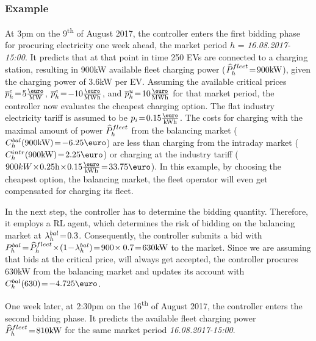 \documentclass[a4paper, 12pt]{article}
\begin{document}
\subsubsection{Example}
\label{sec:orgf77673c}
At 3pm on the 9\textsuperscript{th} of August 2017, the controller enters the first bidding
phase for procuring electricity one week ahead, the market period \(h\) =
\emph{16.08.2017-15:00}. It predicts that at that point in time 250 EVs are connected
to a charging station, resulting in 900kW available fleet charging power
(\(\widehat{P}^{fleet}_{h}\!=\!900\text{kW}\)), given the charging power of 3.6kW per EV. Assuming the
available critical prices \(\ccp{h}\!=\!5\emw\), \(\cep{h}\!=\!-10\emwh\), and
\(\cup{h}\!=\!10\emwh\) for that market period, the controller now evaluates the
cheapest charging option. The flat industry electricity tariff is assumed to be
\(p_i\!=\!0.15\ekwh\). The costs for charging with the maximal amount of power
\(\widehat{P}^{fleet}_{h}\) from the balancing market (\(\Cb{h}(900\kw)\!=\!-6.25\eur\)) are less
than charging from the intraday market (\(\Ci{h}(900\kw)\!=\!2.25\eur\)) or
charging at the industry tariff
(\(900kW\!\times\!0.25\text{h}\!\times\!0.15\ekwh\!=\!33.75\eur\)). In this
example, by choosing the cheapest option, the balancing market, the fleet
operator will even get compensated for charging its fleet.

In the next step, the controller has to determine the bidding quantity.
Therefore, it employs a RL agent, which determines the risk of bidding on the
balancing market at \(\lambda^{bal}_{h}\!=\!0.3\). Consequently, the controller submits a bid
with
\(\Pb{h}\!=\!\fPhat{h}\!\times\!(1\!-\!\lb{h})\!=\!900\!\times0.7\!=\!630\kw\) to
the market. Since we are assuming that bids at the critical price, will always
get accepted, the controller procures 630kW from the balancing market and
updates its account with \(\Cb{h}(630)\!=\!-4.725\eur\).

One week later, at 2:30pm on the 16\textsuperscript{th} of August 2017, the controller enters
the second bidding phase. It predicts the available fleet charging power
\(\widehat{P}^{fleet}_{h}\!=\!810\text{kW}\) for the same market period \emph{16.08.2017-15:00}.
\end{document}
